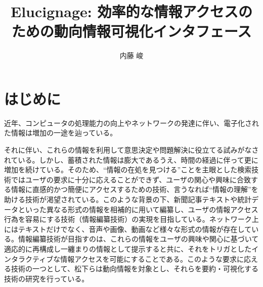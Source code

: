\documentclass{matsushita-zemi}
\title{Elucignage: 効率的な情報アクセスのための動向情報可視化インタフェース}
\author{内藤 峻}
\begin{document}
\maketitle


\section{はじめに}
\label{background}

近年、コンピュータの処理能力の向上やネットワークの発達に伴い、電子化された情報は増加の一途を辿っている。
それに伴い、これらの情報を利用して意思決定や問題解決に役立てる試みがなされている。しかし、蓄積された情報は膨大であるうえ、時間の経過に伴って更に増加を続けている。そのため、“情報の在処を見つける”ことを主眼とした検索技術ではユーザの要求に十分に応えることができず、ユーザの関心や興味に合致する情報に直感的かつ簡便にアクセスするための技術、言うなれば“情報の理解”を助ける技術が渇望されている。このような背景の下、新聞記事テキストや統計データといった異なる形式の情報を相補的に用いて編纂し、ユーザの情報アクセス行為を容易にする技術（情報編纂技術）の実現を目指している\cite{information_compilation}\cite{InformationcompiledStudyGroup}。ネットワーク上にはテキストだけでなく、音声や画像、動画など様々な形式の情報が存在している。情報編纂技術が目指すのは、これらの情報をユーザの興味や関心に基づいて適応的に再構成し一纏まりの情報として提示すると共に、それをトリガとしたインタラクティブな情報アクセスを可能にすることである。このような要求に応える技術の一つとして、松下らは動向情報を対象とし、それらを要約・可視化する技術の研究を行っている\cite{STEND}。
\end{document}
